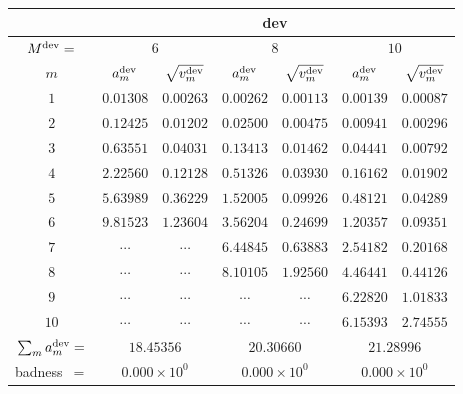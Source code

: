 \begin{tabular}{c|cc|cc|cc|}
&
\multicolumn{6}{|c|}{dev} \\
\hline
$M^{\mathrm{dev}}=$ &
 \multicolumn{2}{|c|}{$6$} &
 \multicolumn{2}{|c|}{$8$} &
 \multicolumn{2}{|c|}{$10$} \\
$m$ &
 $a^{\mathrm{dev}}_m$ & $\sqrt{v^{\mathrm{dev}}_m}$ &
 $a^{\mathrm{dev}}_m$ & $\sqrt{v^{\mathrm{dev}}_m}$ &
 $a^{\mathrm{dev}}_m$ & $\sqrt{v^{\mathrm{dev}}_m}$ \\
$1$ &
 $0.01308$ & $0.00263$ &
 $0.00262$ & $0.00113$ &
 $0.00139$ & $0.00087$ \\
$2$ &
 $0.12425$ & $0.01202$ &
 $0.02500$ & $0.00475$ &
 $0.00941$ & $0.00296$ \\
$3$ &
 $0.63551$ & $0.04031$ &
 $0.13413$ & $0.01462$ &
 $0.04441$ & $0.00792$ \\
$4$ &
 $2.22560$ & $0.12128$ &
 $0.51326$ & $0.03930$ &
 $0.16162$ & $0.01902$ \\
$5$ &
 $5.63989$ & $0.36229$ &
 $1.52005$ & $0.09926$ &
 $0.48121$ & $0.04289$ \\
$6$ &
 $9.81523$ & $1.23604$ &
 $3.56204$ & $0.24699$ &
 $1.20357$ & $0.09351$ \\
$7$ &
 $\cdots$ & $\cdots$ &
 $6.44845$ & $0.63883$ &
 $2.54182$ & $0.20168$ \\
$8$ &
 $\cdots$ & $\cdots$ &
 $8.10105$ & $1.92560$ &
 $4.46441$ & $0.44126$ \\
$9$ &
 $\cdots$ & $\cdots$ &
 $\cdots$ & $\cdots$ &
 $6.22820$ & $1.01833$ \\
$10$ &
 $\cdots$ & $\cdots$ &
 $\cdots$ & $\cdots$ &
 $6.15393$ & $2.74555$ \\
\hline
$\sum_m a^{\mathrm{dev}}_m=$ &
 \multicolumn{2}{|c|}{$18.45356$} &
 \multicolumn{2}{|c|}{$20.30660$} &
 \multicolumn{2}{|c|}{$21.28996$} \\
badness~$=$ &
 \multicolumn{2}{|c|}{$0.000\times 10^{0}$} &
 \multicolumn{2}{|c|}{$0.000\times 10^{0}$} &
 \multicolumn{2}{|c|}{$0.000\times 10^{0}$} \\
\end{tabular}
